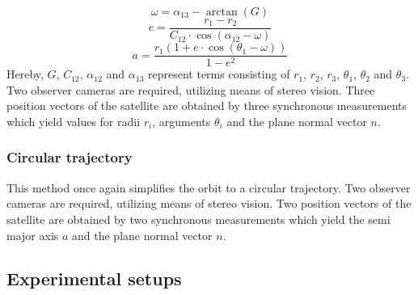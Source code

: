 \documentclass[10pt,a4paper]{article}
\begin{document}
	\begin{equation}
		\omega=\alpha_{13}-\arctan(G)
	\end{equation}
	\begin{equation}
		e=\frac{r_1-r_2}{C_{12}\cdot\cos(\alpha_{12}-\omega)}
	\end{equation}
	\begin{equation}
		a=\frac{r_1(1+e\cdot\cos(\theta_1-\omega))}{1-e^2}
	\end{equation}
	\noindent
	Hereby, $G$, $C_{12}$, $\alpha_{12}$ and $\alpha_{13}$ represent terms consisting of $r_1$, $r_2$, $r_3$, $\theta_1$, $\theta_2$ and $\theta_3$.\newline
	Two observer cameras are required, utilizing means of stereo vision. Three position vectors of the satellite are obtained by three synchronous measurements which yield values for radii $r_i$, arguments $\theta_i$ and the plane normal vector $n$. \cite{orbit_determination_preliminary}

	\subsubsection{Circular trajectory}\label{sec:circular_parametric_trajectory}
	This method once again simplifies the orbit to a circular trajectory. Two observer cameras are required, utilizing means of stereo vision. Two position vectors of the satellite are obtained by two synchronous measurements which yield the semi major axis $a$ and the plane normal vector $n$. \cite{orbit_determination_preliminary}
	
	\subsection{Experimental setups}
\end{document}
